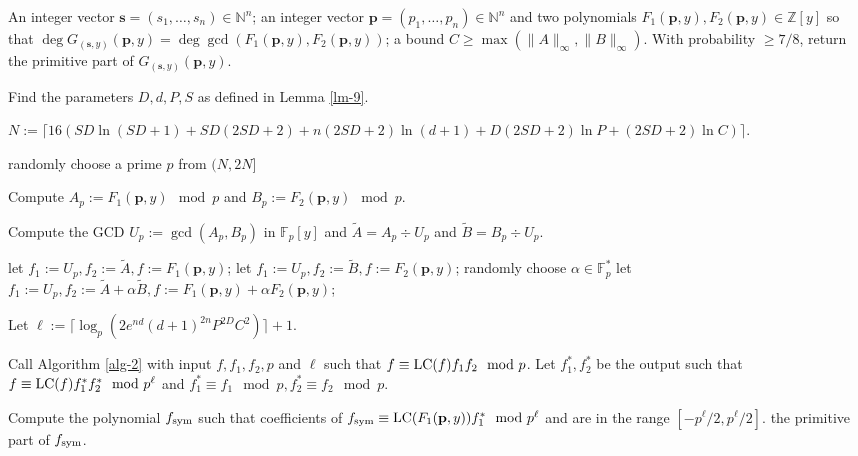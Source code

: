 \documentclass[final,20pt]{elsarticle}
\def\N{{\mathbb N}}
\def\Z{{\mathbb Z}}
\def\F{{\mathbb{F}}}
\def\LC{\hbox{\rm{LC}}}
\begin{document}
\begin{algorithm}[H]
\caption{Univariate polynomial GCD.}\label{alg-3}
\begin{algorithmic}[1]
\REQUIRE An integer vector $\mathbf{s}=(s_1,\dots,s_n)\in \N^n$; an integer vector $\mathbf{p}=(p_1,\dots,p_n)\in \N^n$ and two polynomials $F_1(\mathbf{p},y),F_2(\mathbf{p},y)\in \Z[y]$ so that $\deg G_{(\mathbf{s},y)}(\mathbf{p},y)=\deg \gcd(F_1(\mathbf{p},y),F_2(\mathbf{p},y))$;
a bound $C\geq \max(\|A\|_{\infty},\|B\|_{\infty})$.
\ENSURE With probability $\geq 7/8$, return the primitive part of $G_{(\mathbf{s},y)}(\mathbf{p},y)$.


\STATE Find the parameters $D,d,P,S$ as defined in Lemma \ref{lm-9}.

\STATE $N:=\lceil 16(SD\ln(SD+1)+SD(2SD+2)+n(2SD+2)\ln(d+1)+D(2SD+2)\ln P+(2SD+2)\ln C)\rceil$.\label{alg-3-2}

\REPEAT
\STATE randomly choose a prime $p$ from $(N,2N]$ \label{alg-3-3} \UNTIL {$p \not | \, LC(F_1(\mathbf{p},y))$ or $p \not | \, \LC(F_2(\mathbf{p},y))$.}

\STATE Compute $A_p:=F_1(\mathbf{p},y)\mod p$ and $B_p:=F_2(\mathbf{p},y)\mod p$.\label{alg-3-4}

\STATE  Compute the GCD $U_p:=\gcd(A_p,B_p)$ in $\F_p[y]$ and $\widetilde{A} = A_p \div U_p$ and $\widetilde{B}=B_p \div U_p$. \label{alg-3-5}

     \STATE let $f_1:=U_p,f_2:=\widetilde{A},f:=F_1(\mathbf{p},y)$;
  \STATE  let $f_1:=U_p,f_2:=\widetilde{B},f:=F_2(\mathbf{p},y)$;
  \ELSE
    \REPEAT
    \STATE randomly choose $\alpha\in \F^{*}_p$ \label{alg-3-132}
    \STATE let $f_1:=U_p, f_2:=\widetilde{A}+\alpha \widetilde{B},f:=F_1(\mathbf{p},y)+\alpha F_2(\mathbf{p},y)$;\label{alg-3-131}
 \ENDIF \label{alg-3-13}

\STATE Let $\ell:=\lceil\log _p (2e^{nd}(d+1)^{2n}P^{2D}C^2)\rceil+1$.\label{alg-3-15}

\STATE Call Algorithm \ref{alg-2} with input $f,f_1,f_2,p$ and $\ell$ such that $f\equiv \LC(f) f_1f_2 \mod p$. Let $f_1^*,f_2^*$ be the output such that $f\equiv \LC(f)f_1^*f_2^* \mod p^{\ell}$ and $f_1^*\equiv f_1 \mod p,f_2^*\equiv f_2 \mod p$.\label{alg-3-16}

\STATE Compute the polynomial $f_{\rm sym}$ such that coefficients of $f_{\rm sym}\equiv\LC(F_1(\mathbf{p},y))f^*_1 \mod p^{\ell}$ and are
in the range $[-p^{\ell}/2,p^{\ell}/2]$.
\RETURN the primitive part of $f_{\rm sym}$\label{alg-3-17}.

\end{algorithmic}
\end{algorithm}
\end{document}
